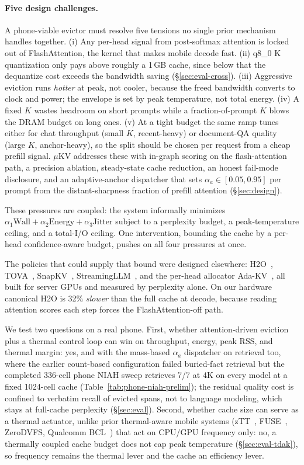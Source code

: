 \documentclass[sigconf, anonymous=false, screen=true]{acmart}
\begin{document}
\paragraph{Five design challenges.} A phone-viable evictor must resolve five tensions no single prior mechanism handles together. (i) Any per-head signal from post-softmax attention is locked out of FlashAttention, the kernel that makes mobile decode fast. (ii) q8\_0 K quantization only pays above roughly a 1\,GB cache, since below that the dequantize cost exceeds the bandwidth saving (\S\ref{sec:eval-cross}). (iii) Aggressive eviction runs \emph{hotter} at peak, not cooler, because the freed bandwidth converts to clock and power; the envelope is set by peak temperature, not total energy. (iv) A fixed $K$ wastes headroom on short prompts while a fraction-of-prompt $K$ blows the DRAM budget on long ones. (v) At a tight budget the same ramp tunes either for chat throughput (small $K$, recent-heavy) or document-QA quality (large $K$, anchor-heavy), so the split should be chosen per request from a cheap prefill signal. $\mu$KV addresses these with in-graph scoring on the flash-attention path, a precision ablation, steady-state cache reduction, an honest fail-mode disclosure, and an adaptive-anchor dispatcher that sets $\alpha_a\in[0.05,0.95]$ per prompt from the distant-sharpness fraction of prefill attention (\S\ref{sec:design}).

These pressures are coupled: the system informally minimizes $\alpha_1 \text{Wall} + \alpha_2 \text{Energy} + \alpha_3 \text{Jitter}$ subject to a perplexity budget, a peak-temperature ceiling, and a total-I/O ceiling. One intervention, bounding the cache by a per-head confidence-aware budget, pushes on all four pressures at once.

The policies that could supply that bound were designed elsewhere: H2O~\cite{zhang2023h2o}, TOVA~\cite{oren2024tova}, SnapKV~\cite{li2024snapkv}, StreamingLLM~\cite{xiao2024streamingllm}, and the per-head allocator Ada-KV~\cite{feng2025adakv}, all built for server GPUs and measured by perplexity alone. On our hardware canonical H2O is 32\% \emph{slower} than the full cache at decode, because reading attention scores each step forces the FlashAttention-off path.

We test two questions on a real phone. First, whether attention-driven eviction plus a thermal control loop can win on throughput, energy, peak RSS, and thermal margin: yes, and with the mass-based $\alpha_a$ dispatcher on retrieval too, where the earlier count-based configuration failed buried-fact retrieval but the completed 336-cell phone NIAH sweep retrieves 7/7 at 4K on every model at a fixed 1024-cell cache (Table~\ref{tab:phone-niah-prelim}); the residual quality cost is confined to verbatim recall of evicted spans, not to language modeling, which stays at full-cache perplexity (\S\ref{sec:eval}). Second, whether cache size can serve as a thermal actuator, unlike prior thermal-aware mobile systems (zTT~\cite{kim2021ztt}, FUSE~\cite{liu2022fuse}, ZeroDVFS, Qualcomm BCL~\cite{qualcommbcl}) that act on CPU/GPU frequency only: no, a thermally coupled cache budget does not cap peak temperature (\S\ref{sec:eval-tdak}), so frequency remains the thermal lever and the cache an efficiency lever.
\end{document}

